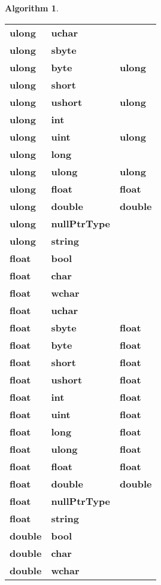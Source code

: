 \documentclass[a4paper,oneside,11pt]{book}
\theoremstyle{definition}
\newtheorem{algo}{Algorithm}[section]
\begin{document}
\begin{algo}
\begin{flushleft}
\begin{supertabular}{lll}
\textbf{ulong}& \textbf{uchar}& \\
\textbf{ulong}& \textbf{sbyte}& \\
\textbf{ulong}& \textbf{byte}& \textbf{ulong}\\
\textbf{ulong}& \textbf{short}& \\
\textbf{ulong}& \textbf{ushort}& \textbf{ulong}\\
\textbf{ulong}& \textbf{int}& \\
\textbf{ulong}& \textbf{uint}& \textbf{ulong}\\
\textbf{ulong}& \textbf{long}& \\
\textbf{ulong}& \textbf{ulong}& \textbf{ulong}\\
\textbf{ulong}& \textbf{float}& \textbf{float}\\
\textbf{ulong}& \textbf{double}& \textbf{double}\\
\textbf{ulong}& \textbf{nullPtrType}& \\
\textbf{ulong}& \textbf{string}& \\
\hline
\textbf{float}& \textbf{bool}& \\
\textbf{float}& \textbf{char}& \\
\textbf{float}& \textbf{wchar}& \\
\textbf{float}& \textbf{uchar}& \\
\textbf{float}& \textbf{sbyte}& \textbf{float}\\
\textbf{float}& \textbf{byte}& \textbf{float}\\
\textbf{float}& \textbf{short}& \textbf{float}\\
\textbf{float}& \textbf{ushort}& \textbf{float}\\
\textbf{float}& \textbf{int}& \textbf{float}\\
\textbf{float}& \textbf{uint}& \textbf{float}\\
\textbf{float}& \textbf{long}& \textbf{float}\\
\textbf{float}& \textbf{ulong}& \textbf{float}\\
\textbf{float}& \textbf{float}& \textbf{float}\\
\textbf{float}& \textbf{double}& \textbf{double}\\
\textbf{float}& \textbf{nullPtrType}& \\
\textbf{float}& \textbf{string}& \\
\hline
\textbf{double}& \textbf{bool}& \\
\textbf{double}& \textbf{char}& \\
\textbf{double}& \textbf{wchar}& \\

\end{supertabular}
\end{flushleft}
\end{algo}
\end{document}
